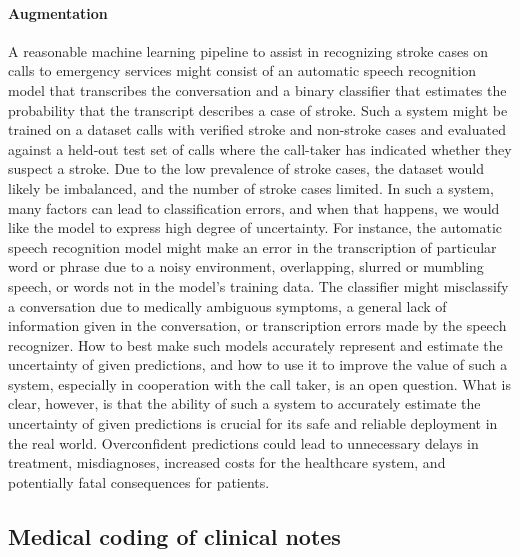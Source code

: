 \paragraph{Augmentation} A reasonable machine learning pipeline to assist in recognizing stroke cases on calls to emergency services might consist of an automatic speech recognition model that transcribes the conversation and a binary classifier that estimates the probability that the transcript describes a case of stroke. 
Such a system might be trained on a dataset calls with verified stroke and non-stroke cases and evaluated against a held-out test set of calls where the call-taker has indicated whether they suspect a stroke. Due to the low prevalence of stroke cases, the dataset would likely be imbalanced, and the number of stroke cases limited. 
In such a system, many factors can lead to classification errors, and when that happens, we would like the model to express high degree of uncertainty. 
For instance, the automatic speech recognition model might make an error in the transcription of particular word or phrase due to a noisy environment, overlapping, slurred or mumbling speech, or words not in the model's training data. 
The classifier might misclassify a conversation due to medically ambiguous symptoms, a general lack of information given in the conversation, or transcription errors made by the speech recognizer. 
How to best make such models accurately represent and estimate the uncertainty of given predictions, and how to use it to improve the value of such a system, especially in cooperation with the call taker, is an open question.
What is clear, however, is that the ability of such a system to accurately estimate the uncertainty of given predictions is crucial for its safe and reliable deployment in the real world. Overconfident predictions could lead to unnecessary delays in treatment, misdiagnoses, increased costs for the healthcare system, and potentially fatal consequences for patients.


\subsection{Medical coding of clinical notes}
%
